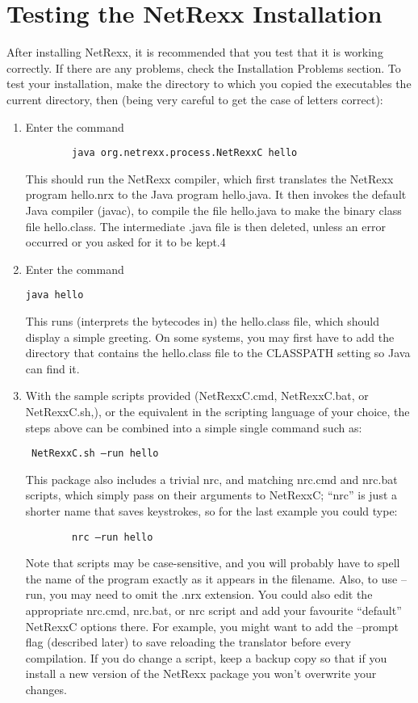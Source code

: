 \section{Testing the NetRexx Installation}\label{testing}
After installing NetRexx, it is recommended that you test that it is working correctly. If there are any problems, check the Installation Problems section. 
To test your installation, make the directory to which you copied the executables the current directory, then (being very careful to get the case of letters correct):
\begin{enumerate}
\item Enter the command
 \begin{verbatim}
        java org.netrexx.process.NetRexxC hello
\end{verbatim}
This should run the NetRexx compiler, which first translates the NetRexx program hello.nrx to the Java program hello.java. It then invokes the default Java compiler (javac), to compile the file hello.java to make the binary class file hello.class. The intermediate .java file is then deleted, unless an error occurred or you asked for it to be kept.4 
\item Enter the command
 \begin{verbatim} 
java hello 
\end{verbatim}
This runs (interprets the bytecodes in) the hello.class file, which should display a simple greeting. On some systems, you may first have to add the directory that contains the hello.class file to the CLASSPATH setting so Java can find it. 
\item With the sample scripts provided (NetRexxC.cmd, NetRexxC.bat, or NetRexxC.sh,), or the equivalent in the scripting language of your choice, the steps above can be combined into a simple single command such as:
  \begin{verbatim}
 NetRexxC.sh –run hello
\end{verbatim}
This package also includes a trivial nrc, and matching nrc.cmd and nrc.bat scripts, which simply pass on their arguments to NetRexxC; “nrc” is just a shorter name that saves keystrokes, so for the last example you could type: 
  \begin{verbatim}
        nrc –run hello
\end{verbatim}
Note that scripts may be case-sensitive, and you will probably have to spell the name of the program exactly as it appears in the filename. Also, to use –run, you may need to omit the .nrx extension. 
You could also edit the appropriate nrc.cmd, nrc.bat, or nrc script and add your favourite “default” NetRexxC options there. For example, you might want to add the –prompt flag (described later) to save reloading the translator before every compilation. If you do change a script, keep a backup copy so that if you install a new version of the NetRexx package you won’t overwrite your changes. 
\end{enumerate}
